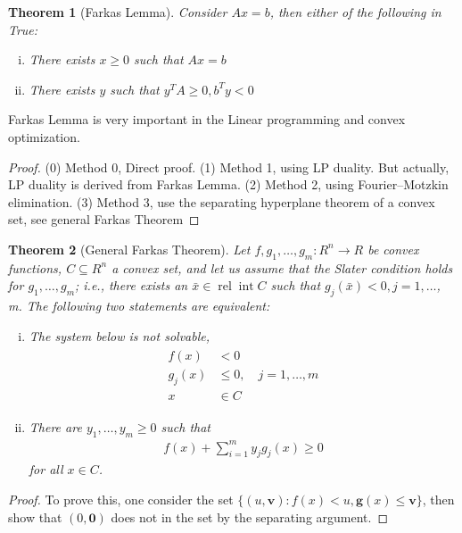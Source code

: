\documentclass{beamerswitch}
\newtheorem{thm}{Theorem}[section]
\begin{document}
\begin{thm}[Farkas Lemma]
    Consider \(Ax = b\), then either of the following in True:
    \begin{enumerate}[(i)]
        \item There exists \(x \ge 0\) such that \(Ax = b\)
        \item There exists \(y\) such that \(y^TA \ge 0, b^Ty < 0\)
    \end{enumerate}
\end{thm}

Farkas Lemma is very important in the Linear programming and convex optimization.
\begin{proof}
    (0) Method 0, Direct proof.
    (1) Method 1, using LP duality. But actually, LP duality is derived from Farkas Lemma.
    (2) Method 2, using Fourier–Motzkin elimination.
    (3) Method 3, use the separating hyperplane theorem of a convex set, see general Farkas Theorem
\end{proof}

\begin{thm}[General Farkas Theorem]
    Let $f, g_{1}, \ldots, g_{m}: R ^{n} \rightarrow R$ be convex functions, $C \subseteq R ^{n}$ a convex set, and let us assume that the Slater condition holds for $g_{1}, \ldots, g_{m}$; i.e., there exists an $\bar{x} \in \operatorname{rel} \operatorname{int} C$ such that $g_{j}(\bar{x})<0, j=1, \ldots$, m. The following two statements are equivalent:
    \begin{enumerate}[(i)]
        \item  The system below is not solvable,
              \begin{align*}
                  \begin{aligned}
                      f(x)     & <0                           \\
                      g_{j}(x) & \leq 0, \quad j=1, \ldots, m \\
                      x        & \in C
                  \end{aligned}
              \end{align*}
        \item  There are $y_{1}, \ldots, y_{m} \geq 0$ such that
              \begin{align*}
                  f(x)+\sum_{i=1}^{m} y_{j} g_{j}(x) \geq 0
              \end{align*}
              for all $x \in C$.
    \end{enumerate}
\end{thm}
\begin{proof}
    To prove this, one consider the set \(\{(u, \bm v): f(x) < u, \bm g(x) \le \bm v\}\), then show that \((0, \bm 0)\) does not in the set by the separating argument.
\end{proof}
\end{document}
